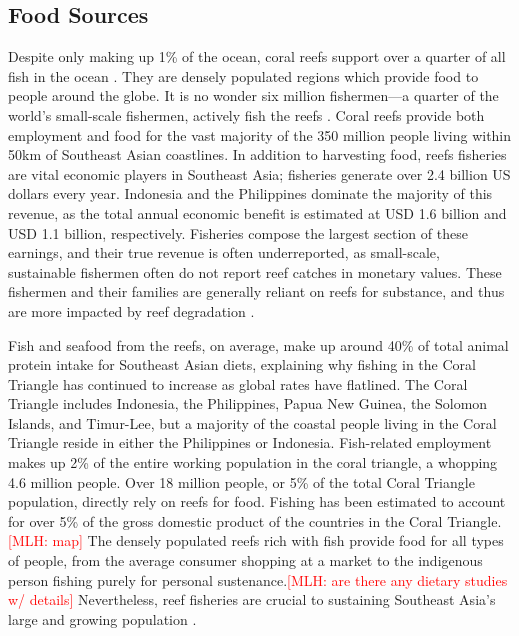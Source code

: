 \documentclass{book}\usepackage{knitr}
\newcommand{\red}[1]{\textcolor{red}{[MLH: #1]}}
\begin{document}
{\subsection{Food Sources}

Despite only making up 1\% of the ocean, coral reefs support over a quarter of all fish in the ocean \citep{noaa}. They are densely populated regions which provide food to people around the globe. It is no wonder six million fishermen—a quarter of the world's small-scale fishermen, actively fish the reefs \citep{coralreefalliance_2021}. Coral reefs provide both employment and food for the vast majority of the 350 million people living within 50km of Southeast Asian coastlines. In addition to harvesting food, reefs fisheries are vital economic players in Southeast Asia; fisheries generate over 2.4 billion US dollars every year. Indonesia and the Philippines dominate the majority of this revenue, as the total annual economic benefit is estimated at USD 1.6 billion and USD 1.1 billion, respectively.  Fisheries compose the largest section of these earnings, and their true revenue is often underreported, as small-scale, sustainable fishermen often do not report reef catches in monetary values. These fishermen and their families are generally reliant on reefs for substance, and thus are more impacted by reef degradation \citep{RAR}.

Fish and seafood from the reefs, on average, make up around 40\% of total animal protein intake for Southeast Asian diets, explaining why fishing in the Coral Triangle has continued to increase as global rates have flatlined. The Coral Triangle includes Indonesia, the Philippines, Papua New Guinea, the Solomon Islands, and Timur-Lee, but a majority of the coastal people living in the Coral Triangle reside in either the Philippines or Indonesia. Fish-related employment makes up 2\% of the entire working population in the coral triangle, a whopping 4.6 million people. Over 18 million people, or 5\% of the total Coral Triangle population, directly rely on reefs for food. Fishing has been estimated to account for over 5\% of the gross domestic product of the countries in the Coral Triangle.\red{map} The densely populated reefs rich with fish provide food for all types of people, from the average consumer shopping at a market to the indigenous person fishing purely for personal sustenance.\red{are there any dietary studies w/ details} Nevertheless, reef fisheries are crucial to sustaining Southeast Asia’s large and growing population \citep{coraltriangle}.

}
\end{document}
